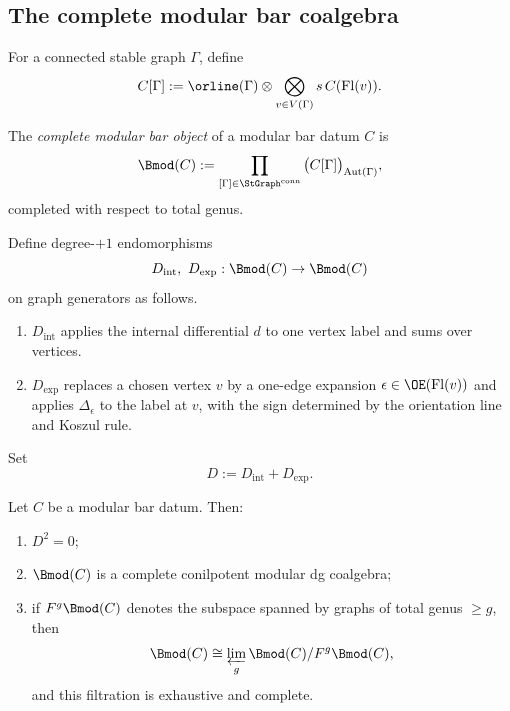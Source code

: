 \subsection{The complete modular bar coalgebra}

For a connected stable graph $\Gamma$, define
\[
C[\Gamma]:=
\orline(\Gamma)\otimes\bigotimes_{v\in V(\Gamma)} s\,C(\mathrm{Fl}(v)).
\]

\begin{definition}
The \emph{complete modular bar object} of a modular bar datum $C$ is
\[
\Bmod(C):=
\prod_{[\Gamma]\in \StGraph^{\mathrm{conn}}}
\big(C[\Gamma]\big)_{\mathrm{Aut}(\Gamma)},
\]
completed with respect to total genus.
\end{definition}

\begin{definition}
Define degree-$+1$ endomorphisms
\[
D_{\mathrm{int}},\ D_{\mathrm{exp}}:\Bmod(C)\to \Bmod(C)
\]
on graph generators as follows.
\begin{enumerate}[leftmargin=2.4em]
\item $D_{\mathrm{int}}$ applies the internal differential $d$ to one vertex label and
sums over vertices.
\item $D_{\mathrm{exp}}$ replaces a chosen vertex $v$ by a one-edge expansion
$\epsilon\in \OE(\mathrm{Fl}(v))$ and applies $\Delta_\epsilon$ to the label at $v$,
with the sign determined by the orientation line and Koszul rule.
\end{enumerate}
Set
\[
D:=D_{\mathrm{int}}+D_{\mathrm{exp}}.
\]
\end{definition}

\begin{theorem}\label{thm:modular-bar}
Let $C$ be a modular bar datum. Then:
\begin{enumerate}[leftmargin=2.4em]
\item $D^2=0$;
\item $\Bmod(C)$ is a complete conilpotent modular dg coalgebra;
\item if $F^g\Bmod(C)$ denotes the subspace spanned by graphs of total genus $\ge g$, then
\[
\Bmod(C)\cong \varprojlim_g \Bmod(C)/F^g\Bmod(C),
\]
and this filtration is exhaustive and complete.
\end{enumerate}
\end{theorem}

